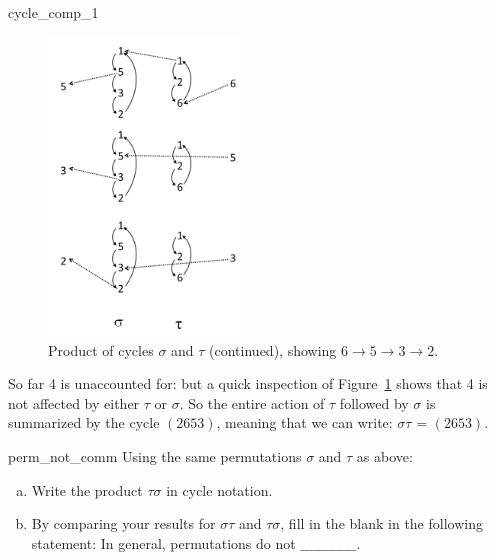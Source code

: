 \begin{example}{cycle_comp_1}
\begin{figure}[ht]
\begin{center}
\includegraphics[width=2.0in]{images/cycle_composition_finish.png}
\caption{Product of cycles $\sigma$ and $\tau$ (continued), showing $6\rightarrow5\rightarrow3\rightarrow2$.}
\label{fig:cycle_composition_finish}
\end{center}
\end{figure}
So far 4 is unaccounted for: but a quick inspection of Figure~\ref{fig:cycle_composition_finish} shows that 4 is not affected by either $\tau$ or $\sigma$.  
So  the entire action of $\tau$ followed by $\sigma$  is summarized by the cycle $(2653)$, meaning that we can write: $\sigma \tau$  = $(2653)$.
\end{example}

\begin{exercise}{perm_not_comm}
Using the same permutations $\sigma$ and $\tau$ as above:
\begin{enumerate}[(a)]
\item
Write the product $\tau \sigma$ in cycle notation.
\item
By comparing your results for $\sigma \tau$ and $\tau \sigma$, fill in the blank in the following statement:  In general, permutations do not $\_\_\_\_\_\_\_\_\_\_\_\_$.
\end{enumerate}
\end{exercise}


